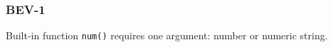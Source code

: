 \subsubsection{BEV-1}\label{sec:error_code_bev_1}

Built-in function \texttt{num()} requires one argument: number or numeric string.


